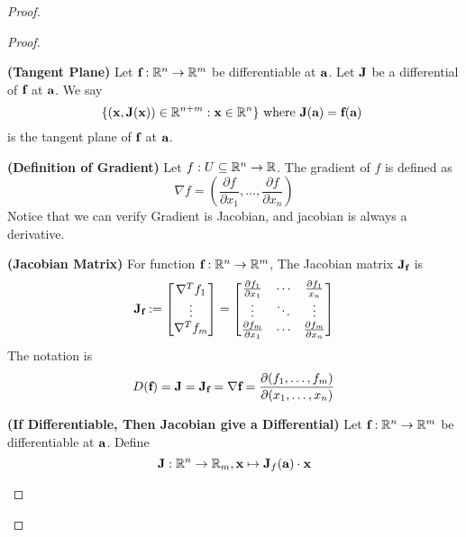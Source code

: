 \documentclass{report}
\begin{document}
\begin{proof}
\begin{proof}
\begin{definition}
\label{5.2.4}
\textbf{(Tangent Plane)} Let $\textbf{f}:\mathbb{R}^n\rightarrow \mathbb{R}^m$ be differentiable at $\textbf{a}$. Let $\textbf{J}$ be a differential of $\textbf{f}$ at $\textbf{a}$. We say
\begin{equation}
\{ (\textbf{x},\textbf{J}(\textbf{x}))\in\mathbb{R}^{n+m}:\textbf{x}\in\mathbb{R}^n \}\text{ where $\textbf{J}(\textbf{a})=\textbf{f}(\textbf{a})$ }
\end{equation}
is the tangent plane of $\textbf{f}$ at $\textbf{a}$.
\end{definition}
\begin{definition}
\label{5.2.5}
\textbf{(Definition of Gradient)}  Let $f:U\subseteq \mathbb{R}^n \rightarrow \mathbb{R}$. The gradient of $f$ is defined as
\begin{equation}
  \nabla f=(\frac{\partial f}{\partial x_1},\dots ,\frac{\partial f}{\partial x_n})
\end{equation}
Notice that we can verify Gradient is Jacobian, and jacobian is always a derivative. 
\end{definition}

\begin{definition}
\label{5.2.6}
\textbf{(Jacobian Matrix)} For function $\textbf{f}:\mathbb{R}^n\rightarrow \mathbb{R}^m$, The Jacobian matrix  $\textbf{J}_{\textbf{f}}$ is  
\begin{equation}
  \textbf{J}_{\textbf{f}}:=\begin{bmatrix}
\nabla ^T f_{1}\\
\vdots\\
\nabla^T f_m
    \end{bmatrix}=\begin{bmatrix}
    \frac{\partial f_1}{\partial x_1}&\cdots & \frac{\partial f_1}{x_n}\\
    \vdots & \ddots & \vdots\\
    \frac{\partial f_m}{\partial x_1} & \cdots & \frac{\partial f_m}{\partial x_n}
    \end{bmatrix}
\end{equation}
The notation is
\begin{equation}
  D(\textbf{f})=\textbf{J}=\textbf{J}_{\textbf{f}}=\nabla \textbf{f}=\frac{\partial (f_1,\dots, f_m)}{\partial  (x_1,\dots,x_n)}
\end{equation}
\end{definition}

\begin{theorem}
\label{5.2.7}
\textbf{(If Differentiable, Then Jacobian give a Differential)}
Let $\textbf{f}:\mathbb{R}^n\rightarrow \mathbb{R}^m$ be differentiable at $\textbf{a}$. Define
\begin{equation}
 \textbf{J}:\mathbb{R}^n\rightarrow \mathbb{R}_m, \textbf{x}\mapsto \textbf{J}_f(\textbf{a})\cdot \textbf{x}
\end{equation}


\end{theorem}
\end{proof}
\end{proof}
\end{document}
